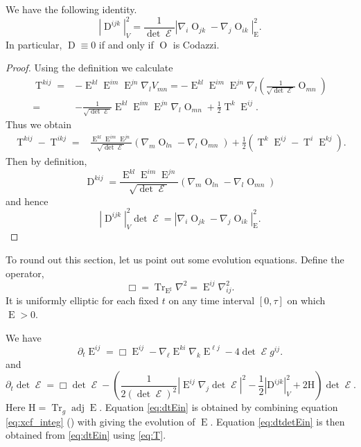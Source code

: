\documentclass{cambridge7a}
\renewcommand{\~}{\tilde}
\renewcommand{\-}{\bar}
\newcommand{\8}{\infty}
\newcommand{\abs}[1]{\left\lvert{#1}\right\rvert}
\DeclareMathOperator{\Tr}{Tr}
\DeclareMathOperator{\Ein}{E}
\DeclareMathOperator{\opEin}{\mathcal{E}}
\DeclareMathOperator{\adj}{adj}
\DeclareMathOperator{\Ob}{O}
\DeclareMathOperator{\T}{T}
\DeclareMathOperator{\Dv}{D}
\begin{document}
\begin{lemma}
\label{lem:cubicform_codazzi}

We have the following identity.
\[
|\Dv^{ijk}|_V^2=\frac{1}{\det\opEin}|\nabla_i\Ob_{jk}-\nabla_j\Ob_{ik}|_{\Ein}^2.
\]
In particular, \(\Dv\equiv 0\) if and only if \(\Ob\) is Codazzi.
\end{lemma}

\begin{proof}
Using the definition we calculate
\begin{align*}
\T^{kij}=&-\Ein^{kl}\Ein^{im}\Ein^{jn}\nabla_l V_{mn} = -\Ein^{kl}\Ein^{im}\Ein^{jn}\nabla_l \left(\frac{1}{\sqrt{\det\opEin}} \Ob_{mn}\right)\\
=&-\frac{1}{\sqrt{\det\opEin}}\Ein^{kl}\Ein^{im}\Ein^{jn}\nabla_l \Ob_{mn}+\frac{1}{2}\T^k\Ein^{ij}.
\end{align*}
Thus we obtain
\begin{align*}
\T^{kij}-\T^{ikj}=&\frac{\Ein^{kl}\Ein^{im}\Ein^{jn}}{\sqrt{\det\opEin}}\left(\nabla_m \Ob_{ln}-\nabla_l \Ob_{mn}\right)+\frac{1}{2}(\T^k\Ein^{ij}-\T^i\Ein^{kj}).
\end{align*}
Then by definition,
\[
\Dv^{kij} = \frac{\Ein^{kl}\Ein^{im}\Ein^{jn}}{\sqrt{\det\opEin}}\left(\nabla_m \Ob_{ln}-\nabla_l \Ob_{mn}\right)
\]
and hence
\[
|\Dv^{ijk}|_V^2\det\opEin = |\nabla_i\Ob_{jk}-\nabla_j\Ob_{ik}|_{\Ein}^2.
\]
\end{proof}

To round out this section, let us point out some evolution equations. Define the operator,
\begin{equation}
\label{eq:box}
\Box = \Tr_{\Ein^{\sharp}} \nabla^2 = \Ein^{ij} \nabla^2_{ij}.
\end{equation}
It is uniformly elliptic for each fixed \(t\) on any time interval \([0, \tau]\) on which \(\Ein > 0\).

We have
\begin{equation}
\label{eq:dtEin}
\partial_t \Ein^{ij} = \Box \Ein^{ij} - \nabla_{\ell} \Ein^{ki} \nabla_k \Ein^{\ell j} - 4 \det \opEin g^{ij}.
\end{equation}
and
\begin{equation}
\label{eq:dtdetEin}
\partial_t \det \opEin = \Box \det \opEin -\left(\frac{1}{2(\det\opEin)^2} \abs{\Ein^{ij} \nabla_j \det \opEin}^2 - \frac{1}{2}\abs{\mathrm{D}^{ijk}}_V^2 + 2\mathrm{H}\right)\det \opEin.
\end{equation}
Here $\mathrm{H}=\Tr_g\adj\Ein.$ 
Equation \eqref{eq:dtEin} is obtained by combining equation \eqref{eq:xcf_integ} (\cite[Lemma 1(a)]{MR2055396}) with \cite[Lemma 5]{MR2055396} giving the evolution of \(\Ein\). Equation \eqref{eq:dtdetEin} is then obtained from \eqref{eq:dtEin} using \eqref{eq:T}.
\end{document}
